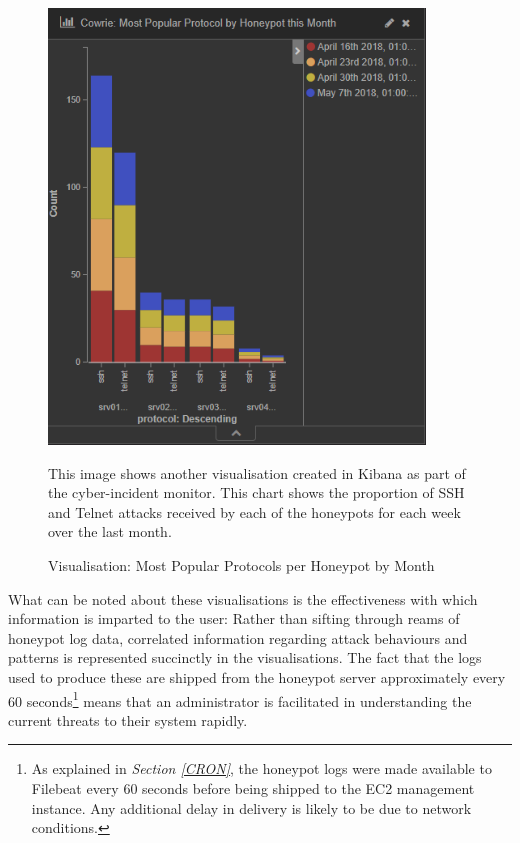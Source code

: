 \begin{figure}[ht]
      \centering
      \includegraphics[width=100mm, scale=0.2]{Images/Cowrie_most_popular_protocol_per_honeypot_this_month.PNG}
      \caption{Visualisation: Most Popular Protocols per Honeypot by Month} 
      \medskip
      \small
		This image shows another visualisation created in Kibana as part of the cyber-incident monitor. This chart shows the proportion of SSH and Telnet attacks received by each of the honeypots for each week over the last month.
\label{fig:Cowrie_most_popular_protocol_per_honeypot_this_month.PNG}
\end{figure}


What can be noted about these visualisations is the effectiveness with which information is imparted to the user: Rather than sifting through reams of honeypot log data, correlated information regarding attack behaviours and patterns is represented succinctly in the visualisations. The fact that the logs used to produce these are shipped from the honeypot server approximately every 60 seconds\footnote{As explained in \textit{Section \ref{CRON}}, the honeypot logs were made available to Filebeat every 60 seconds before being shipped to the EC2 management instance. Any additional delay in delivery is likely to be due to network conditions.} means that an administrator is facilitated in understanding the current threats to their system rapidly. 





